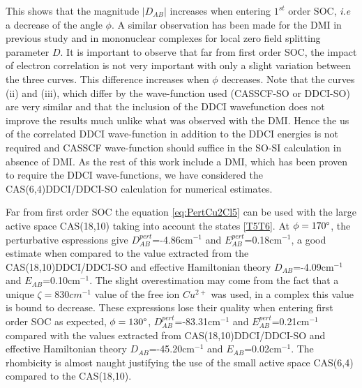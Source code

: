 \documentclass[10pt]{report}
\numberwithin{equation}{section}
\begin{document}
This shows that the magnitude $|D_{AB}|$ increases when entering $1^{st}$ order SOC, \textit{i.e} a decrease of the angle $\phi$.
A similar observation has been made for the DMI in previous study and in mononuclear complexes for local zero field splitting parameter $D$.
It is important to observe that far from first order SOC, the impact of electron correlation is not very important with only a slight variation between the three curves.
This difference increases when $\phi$ decreases.
Note that the curves (ii) and (iii), which differ by the wave-function used (CASSCF-SO or DDCI-SO) are very similar and that the inclusion of the DDCI wavefunction does not improve the results much unlike what was observed with the DMI.
Hence the us of the correlated DDCI wave-function in addition to the DDCI energies is not required and CASSCF wave-function should suffice in the SO-SI calculation in absence of DMI. 
As the rest of this work include a DMI, which has been proven to require the DDCI wave-functions, we have considered the CAS(6,4)DDCI/DDCI-SO calculation for numerical estimates.


Far from first order SOC the equation \ref{eq:PertCu2Cl5} can be used with the large active space CAS(18,10) taking into account the states \ref{T5T6}.
At $\phi=170\degree$, the perturbative espressions give $D_{AB}^{pert}$=-4.86cm$^{-1}$ and $E_{AB}^{pert}$=0.18cm$^{-1}$, a good estimate when compared to the value extracted from the CAS(18,10)DDCI/DDCI-SO and effective Hamiltonian theory $D_{AB}$=-4.09cm$^{-1}$ and $E_{AB}$=0.10cm$^{-1}$.
The slight overestimation may come from the fact that a unique $\zeta=830cm^{-1}$ value of the free ion $Cu^{2+}$ was used, in a complex this value is bound to decrease.
These expressions lose their quality when entering first order SOC as expected, $\phi=130\degree$, $D_{AB}^{pert}$=-83.31cm$^{-1}$ and $E_{AB}^{pert}$=0.21cm$^{-1}$ compared with the values extracted from CAS(18,10)DDCI/DDCI-SO and effective Hamiltonian theory $D_{AB}$=-45.20cm$^{-1}$ and $E_{AB}$=0.02cm$^{-1}$.
The rhombicity is almost naught justifying the use of the small active space CAS(6,4) compared to the CAS(18,10).
\end{document}

